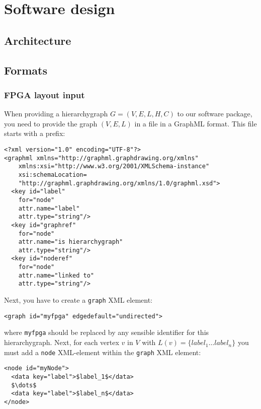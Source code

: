 \section{Software design}
\subsection{Architecture}
\subsection{Formats}
\subsubsection{FPGA layout input}
When providing a hierarchygraph $G=(V, E, L, H, C)$ to our software package, you need to provide the graph $(V, E, L)$ in a file in a GraphML\cite{Brandes04graphmarkup} format. This file starts with a prefix:

\begin{lstlisting}[frame=single]
<?xml version="1.0" encoding="UTF-8"?>
<graphml xmlns="http://graphml.graphdrawing.org/xmlns"  
    xmlns:xsi="http://www.w3.org/2001/XMLSchema-instance"
    xsi:schemaLocation=
    "http://graphml.graphdrawing.org/xmlns/1.0/graphml.xsd">
  <key id="label"
    for="node"
    attr.name="label"
    attr.type="string"/>
  <key id="graphref"
    for="node"
    attr.name="is hierarchygraph"
    attr.type="string"/>
  <key id="noderef"
    for="node"
    attr.name="linked to"
    attr.type="string"/>
\end{lstlisting}


Next, you have to create a \texttt{graph} XML element:

\begin{lstlisting}[frame=single]
<graph id="myfpga" edgedefault="undirected">
\end{lstlisting}


where \texttt{myfpga} should be replaced by any sensible identifier for this hierarchygraph. Next, for each vertex $v$ in $V$ with $L(v)=\{label_1 \dots label_n\}$ you must add a \texttt{node} XML-element within the \texttt{graph} XML element:


\begin{lstlisting}[mathescape, frame=single]
<node id="myNode">
  <data key="label">$label_1$</data>
  $\dots$
  <data key="label">$label_n$</data>
</node>
\end{lstlisting}

